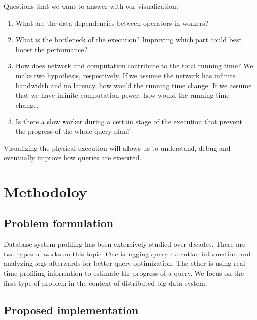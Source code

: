 \documentclass[11pt]{article}
\begin{document}
\vspace{10px}

\noindent Questions that we want to answer with our visualization:

\begin{enumerate}
	\item What are the data dependencies between operators in workers?
	\item What is the bottleneck of the execution? Improving which part could best boost the performance?
	\item How does network and computation contribute to the total running time? We make two hypothesis, respectively. If we assume the network has infinite bandwidth and no latency, how would the running time change. If we assume that we have infinite computation power, how would the running time change.
	\item Is there a slow worker during a certain stage of the execution that prevent the progress of the whole query plan?

\end{enumerate}

Visualizing the physical execution will allows us to understand, debug and eventually improve how queries are executed.

\section{Methodoloy}
\subsection*{Problem formulation}
Database system profiling has been extensively studied over decades. There are two types of works on this topic. One is logging query execution information and analyzing logs afterwards for better query optimization. The other is using real-time profiling information to estimate the progress of a query. We focus on the first type of problem in the context of distributed big data system.

\subsection*{Proposed implementation}
\end{document}
